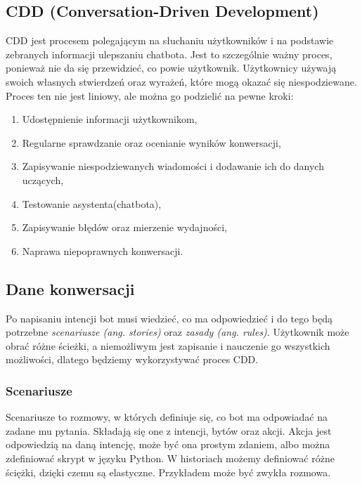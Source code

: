 \documentclass{article}
\begin{document}
\subsection{CDD (Conversation-Driven Development)}
CDD jest procesem polegającym na słuchaniu użytkowników i na podstawie
zebranych informacji ulepszaniu chatbota. Jest to szczególnie ważny proces,
ponieważ nie da się przewidzieć, co powie użytkownik. Użytkownicy używają
swoich własnych stwierdzeń oraz wyrażeń, które mogą okazać się niespodziewane.
Proces ten nie jest liniowy, ale można go podzielić na pewne kroki:
\begin{enumerate}
    \item[\textcolor{violet}{\textbullet}] Udostępnienie informacji użytkownikom,
    \item[\textcolor{violet}{\textbullet}] Regularne sprawdzanie oraz ocenianie wyników konwersacji,
    \item[\textcolor{violet}{\textbullet}] Zapisywanie niespodziewanych wiadomości i dodawanie ich do danych
    uczących,
    \item[\textcolor{violet}{\textbullet}] Testowanie asystenta(chatbota),
    \item[\textcolor{violet}{\textbullet}] Zapisywanie błędów oraz mierzenie wydajności,
    \item[\textcolor{violet}{\textbullet}] Naprawa niepoprawnych konwersacji.
\end{enumerate}

\subsection{Dane konwersacji}
Po napisaniu intencji bot musi wiedzieć, co ma odpowiedzieć i do tego będą
potrzebne \emph{scenariusze (ang. stories)} oraz \emph{zasady (ang. rules)}.
Użytkownik może obrać różne ścieżki, a niemożliwym jest zapisanie i
nauczenie go wszystkich możliwości, dlatego będziemy wykorzystywać proces CDD.

\subsubsection{Scenariusze}
Scenariusze to rozmowy, w których definiuje się, co bot ma odpowiadać na zadane
mu pytania. Składają się one z intencji, bytów oraz akcji. Akcja jest
odpowiedzią na daną intencję, może być ona prostym zdaniem, albo można
zdefiniować skrypt w języku Python. W historiach możemy definiować różne
ściężki, dzięki czemu są elastyczne. Przykładem może być zwykła rozmowa.
\end{document}

